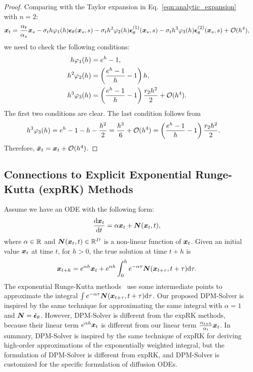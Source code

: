 \begin{proof}
Comparing with the Taylor expansion in Eq.~\eqref{eqn:analytic_expansion} with $n = 2$:
    \[ \bm{x}_t = \frac{\alpha_t}{\alpha_s}\bm{x}_s 
    - \sigma_t h\varphi_{1}(h)\bm{\epsilon}_\theta(\bm{x}_s,s)
    - \sigma_t h^{2}\varphi_{2}(h)\bm{\epsilon}_\theta^{(1)}(\bm{x}_{s},s)
    - \sigma_t h^{3}\varphi_{3}(h)\bm{\epsilon}_\theta^{(2)}(\bm{x}_{s},s)
    +\mathcal O(h^{4}), \]
we need to check the following conditions:
\[
\begin{aligned}
h\varphi_1(h) &= e^h - 1, \\
h^2\varphi_2(h) &= \left ( \frac{e^h - 1}{h} - 1\right ) h, \\
h^3\varphi_3(h) &= \left ( \frac{e^h - 1}{h} - 1\right ) \frac{r_2h^2}{2} + \mathcal O(h^4).
\end{aligned}
\]
The first two conditions are clear. The last condition follows from
\[ \begin{aligned}
h^3 \varphi_3(h) &= e^h  - 1 - h - \frac{h^2}{2} = \frac{h^3}{6} + \mathcal O(h^4) = 
 \left ( \frac{e^h - 1}{h} - 1\right ) \frac{r_2h^2}{2}.
\end{aligned}
\]
Therefore, $\bar {\bm{x}}_t = \bm{x}_t + \mathcal O(h^4)$.
\end{proof}




\subsection{Connections to Explicit Exponential Runge-Kutta (expRK) Methods}
\label{appendix:expRK}
Assume we have an ODE with the following form:
\begin{equation*}
    \frac{\dd\bm{x}_{t}}{\dd t} = \alpha \bm{x}_t + \bm{N}(\bm{x}_t,t),
\end{equation*}
where $\alpha\in \mathbb{R}$ and $\bm{N}(\bm{x}_t,t)\in\mathbb{R}^D$ is a non-linear function of $\bm{x}_t$. Given an initial value $\bm{x}_t$ at time $t$, for $h>0$, the true solution at time $t+h$ is
\begin{equation*}
    \bm{x}_{t+h} = e^{\alpha h}\bm{x}_t
        + e^{\alpha h}\int_0^h e^{-\alpha\tau}\bm{N}(\bm{x}_{t+\tau},t+\tau)\mathrm{d}\tau.
\end{equation*}
The exponential Runge-Kutta methods~\cite{hochbruck2010exponential,hochbruck2005explicit} use some intermediate points to approximate the integral $\int e^{-\alpha\tau}\bm{N}(\bm{x}_{t+\tau},t+\tau)\mathrm{d}\tau$. Our proposed DPM-Solver is inspired by the same technique for approximating the same integral with $\alpha=1$ and $\bm{N}=\tilde{\bm{\epsilon}}_\theta$. 
However, DPM-Solver is different from the expRK methods, because their linear term $e^{\alpha h}\bm{x}_t$ is different from our linear term $\frac{\alpha_{t+h}}{\alpha_t}\bm{x}_t$. In summary, DPM-Solver is inspired by the same technique of expRK for deriving high-order approximations of the exponentially weighted integral, but the formulation of DPM-Solver is different from expRK, and DPM-Solver is customized for the specific formulation of diffusion ODEs.